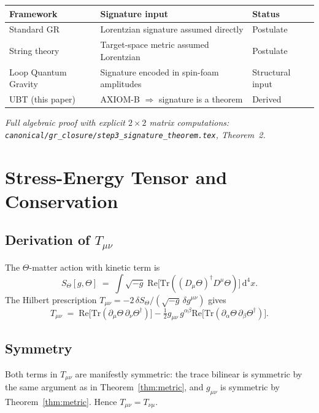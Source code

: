 \documentclass[12pt,a4paper]{article}
\theoremstyle{definition}
\theoremstyle{remark}
\newcommand{\Tmn}{T_{\mu\nu}}
\newcommand{\Tr}{\mathrm{Tr}}
\newcommand{\Re}{\mathrm{Re}}
\begin{document}
\medskip
\begin{center}
\begin{tabular}{lll}
\toprule
\textbf{Framework} & \textbf{Signature input} & \textbf{Status} \\
\midrule
Standard GR        & Lorentzian signature assumed directly & Postulate \\
String theory      & Target-space metric assumed Lorentzian & Postulate \\
Loop Quantum Gravity & Signature encoded in spin-foam amplitudes & Structural input \\
UBT (this paper)   & AXIOM-B $\Rightarrow$ signature is a theorem & Derived \\
\bottomrule
\end{tabular}
\end{center}
\label{tab:signature_comparison}

\medskip
\textit{Full algebraic proof with explicit $2\times 2$ matrix computations:
\texttt{canonical/gr\_closure/step3\_signature\_theorem.tex}, Theorem~2.}

\section{Stress-Energy Tensor and Conservation}
\label{app:tmunu}

\subsection{Derivation of $T_{\mu\nu}$}

The $\Theta$-matter action with kinetic term is
\[
  S_\Theta[g,\Theta] \;=\; \int\!\sqrt{-g}\;
  \Re\bigl[\Tr((D_\mu\Theta)^\dagger D^\mu\Theta)\bigr]\,\mathrm{d}^4x.
\]
The Hilbert prescription $\Tmn = -2\,\delta S_\Theta/(\sqrt{-g}\,\delta g^{\mu\nu})$
gives
\[
  \Tmn \;=\; \Re\bigl[\Tr(\partial_\mu\Theta\,\partial_\nu\Theta^\dagger)\bigr]
  - \tfrac{1}{2}g_{\mu\nu}\,g^{\alpha\beta}
    \Re\bigl[\Tr(\partial_\alpha\Theta\,\partial_\beta\Theta^\dagger)\bigr].
\]

\subsection{Symmetry}

Both terms in $\Tmn$ are manifestly symmetric: the trace bilinear is symmetric
by the same argument as in Theorem~\ref{thm:metric}, and $g_{\mu\nu}$ is
symmetric by Theorem~\ref{thm:metric}.  Hence $\Tmn = T_{\nu\mu}$.
\end{document}
